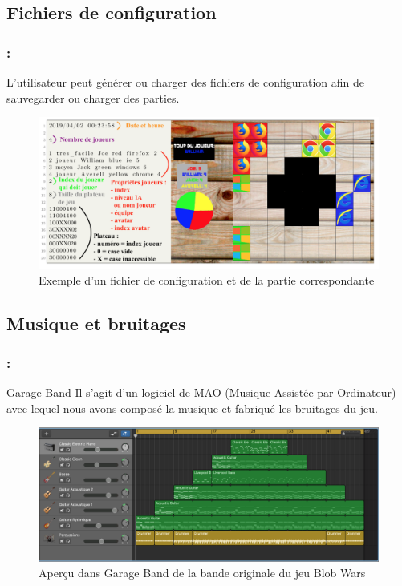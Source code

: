 \documentclass[9pt]{beamer}
\begin{document}
\subsection{Fichiers de configuration}

\begin{frame}[fragile]
\frametitle{\insertsectionhead : \insertsubsectionhead}
L'utilisateur peut générer ou charger des fichiers de configuration afin de sauvegarder ou charger des parties.
\begin{figure}[h]
    \begin{center}
        \includegraphics[width=1\textwidth]{figures/fichierconfig.png}
        \caption{Exemple d’un fichier de configuration et de la partie correspondante}
    \end{center}
\end{figure}
\end{frame}

\subsection{Musique et bruitages}

\begin{frame}[fragile]
\frametitle{\insertsectionhead : \insertsubsectionhead}
\begin{block}{Garage Band}
Il s'agit d'un logiciel de MAO (Musique Assistée par Ordinateur) avec lequel nous avons composé la musique et fabriqué les bruitages du jeu.
\end{block}
\begin{figure}[h]
    \begin{center}
        \includegraphics[width=1\textwidth]{figures/mao.png}
        \caption{Aperçu dans Garage Band de la bande originale du jeu Blob Wars}
    \end{center}
\end{figure}
\end{frame}
\end{document}
